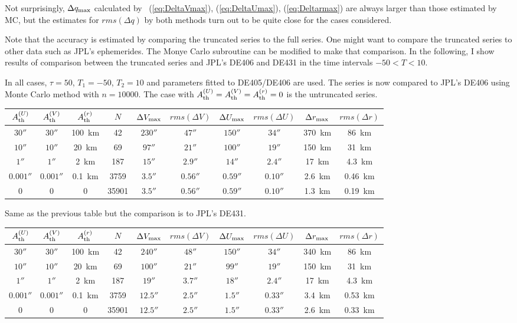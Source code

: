 \documentclass[12pt]{article}
\begin{document}
\vskip 0.5cm
Not surprisingly, $\Delta q_{\rm max}$ calculated by ~(\ref{eq:DeltaVmax}),
(\ref{eq:DeltaUmax}), (\ref{eq:Deltarmax}) are always larger than those estimated by 
MC, but the estimates for $rms(\Delta q)$ by both methods turn out to be quite 
close for the cases considered.

Note that the accuracy is estimated by comparing the truncated series to 
the full series. One might want to compare the truncated series to other 
data such as JPL's ephemerides. The Monye Carlo subroutine can be modified 
to make that comparison. 
In the following, I show results of comparison between the truncated series and 
JPL's DE406 and DE431 in the time intervals $-50 < T <10$. 

\vskip 0.5cm
In all cases, $\tau=50$, $T_1=-50$, $T_2=10$ and parameters fitted to DE405/DE406 are
used. The series is now compared to JPL's DE406 using Monte Carlo method with 
$n=10000$. The case with $A_{\rm th}^{(U)}=A_{\rm th}^{(V)}=A_{\rm th}^{(r)}=0$ 
is the untruncated series.

\begin{tabular}{cccccccccc}
\hline
  $A_{\rm th}^{(U)}$ & $A_{\rm th}^{(V)}$ & $A_{\rm th}^{(r)}$ & $N$ &
  $\Delta V_{\rm max}$ & $rms(\Delta V)$ & $\Delta U_{\rm max}$ & $rms(\Delta U)$
  & $\Delta r_{\rm max}$ & $rms(\Delta r)$ \\
\hline
  $30''$ & $30''$ & 100~km & 42 & $230''$ & $47''$ & $150''$ & $34''$ & 370~km &
86~km \\
  $10''$ & $10''$ & 20~km & 69 & $97''$ & $21''$ & $100''$ & $19''$ & 150~km &
31~km \\
  $1''$ & $1''$ & 2~km & 187 & $15''$ & $2.9''$ & $14''$ & $2.4''$ & 17~km &
4.3~km \\
  $0.001''$ & $0.001''$ & 0.1~km & 3759 & $3.5''$ & $0.56''$ & $0.59''$ & $0.10''$ &
  2.6~km & 0.46~km \\
  0 & 0 & 0 & 35901 & $3.5''$ & $0.56''$ & $0.59''$ & $0.10''$ & 1.3~km & 0.19~km \\
\hline
\end{tabular}

\vskip 0.5cm
Same as the previous table but the comparison is to JPL's DE431.

\begin{tabular}{cccccccccc}
\hline
  $A_{\rm th}^{(U)}$ & $A_{\rm th}^{(V)}$ & $A_{\rm th}^{(r)}$ & $N$ &
  $\Delta V_{\rm max}$ & $rms(\Delta V)$ & $\Delta U_{\rm max}$ & $rms(\Delta U)$
  & $\Delta r_{\rm max}$ & $rms(\Delta r)$ \\
\hline
  $30''$ & $30''$ & 100~km & 42 & $240''$ & $48''$ & $150''$ & $34''$ & 340~km &
86~km \\
  $10''$ & $10''$ & 20~km & 69 & $100''$ & $21''$ & $99''$ & $19''$ & 150~km &
31~km \\
  $1''$ & $1''$ & 2~km & 187 & $19''$ & $3.7''$ & $18''$ & $2.4''$ & 17~km &
4.3~km \\
  $0.001''$ & $0.001''$ & 0.1~km & 3759 & $12.5''$ & $2.5''$ & $1.5''$ & $0.33''$ &
  3.4~km & 0.53~km \\
  0 & 0 & 0 & 35901 & $12.5''$ & $2.5''$ & $1.5''$ & $0.33''$ &
  2.6~km & 0.33~km \\
\hline
\end{tabular}
\end{document}
